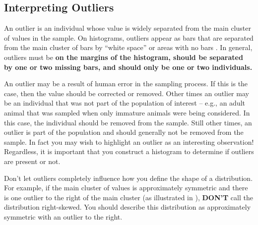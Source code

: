 

\subsection{Interpreting Outliers}
An outlier is an individual whose value is widely separated from the main cluster of values in the sample. On histograms, outliers appear as bars that are separated from the main cluster of bars by ``white space'' or areas with no bars . In general, outliers must be \textbf{on the margins of the histogram, should be separated by one or two missing bars, and should only be one or two individuals.}

\begin{knitrout}
\color{fgcolor}\begin{kframe}


{\ttfamily\noindent\bfseries{}}\end{kframe}
\end{knitrout}

An outlier may be a result of human error in the sampling process. If this is the case, then the value should be corrected or removed. Other times an outlier may be an individual that was not part of the population of interest -- e.g., an adult animal that was sampled when only immature animals were being considered. In this case, the individual should be removed from the sample. Still other times, an outlier is part of the population and should generally not be removed from the sample. In fact you may wish to highlight an outlier as an interesting observation! Regardless, it is important that you construct a histogram to determine if outliers are present or not.

Don't let outliers completely influence how you define the shape of a distribution. For example, if the main cluster of values is approximately symmetric and there is one outlier to the right of the main cluster (as illustrated in ), \textbf{DON'T} call the distribution right-skewed. You should describe this distribution as approximately symmetric with an outlier to the right.


\vspace{-12pt}



